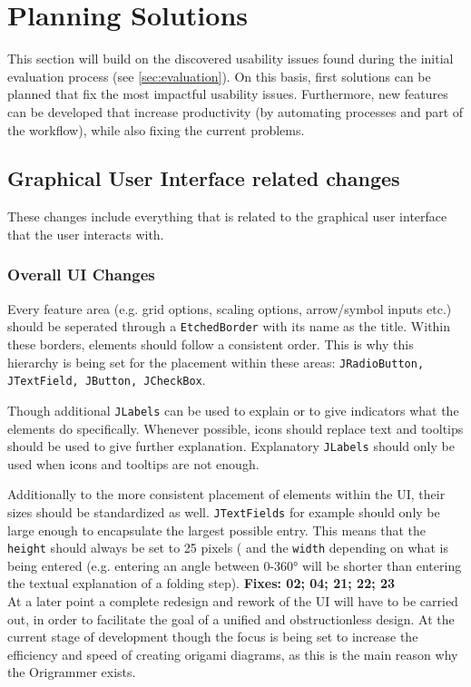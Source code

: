 
\section{Planning Solutions}
\label{sec:planningSolutions}

This section will build on the discovered usability issues found during the initial evaluation process (see \ref{sec:evaluation}). On this basis, first solutions can be planned that fix the most impactful usability issues. Furthermore, new features can be developed that increase productivity (by automating processes and part of the workflow), while also fixing the current problems.


\subsection{Graphical User Interface related changes}

These changes include everything that is related to the graphical user interface that the user interacts with.

\subsubsection{Overall UI Changes}
Every feature area (e.g. grid options, scaling options, arrow/symbol inputs etc.) should be seperated through a \texttt{EtchedBorder} with its name as the title. Within these borders, elements should follow a consistent order. This is why this hierarchy is being set for the placement within these areas: \texttt{JRadioButton, JTextField, JButton, JCheckBox}.

Though additional \texttt{JLabels} can be used to explain or to give indicators what the elements do specifically. Whenever possible, icons should replace text and tooltips should be used to give further explanation. Explanatory \texttt{JLabels} should only be used when icons and tooltips are not enough.

Additionally to the more consistent placement of elements within the UI, their sizes should be standardized as well. \texttt{JTextFields} for example should only be large enough to encapsulate the largest possible entry. This means that the \texttt{height} should always be set to 25 pixels ( and the \texttt{width} depending on what is being entered (e.g. entering an angle between 0-360° will be shorter than entering the textual explanation of a folding step).
\newline
\textbf{Fixes: 02; 04; 21; 22; 23}\\
\newline
At a later point a complete redesign and rework of the UI will have to be carried out, in order to facilitate the goal of a unified and obstructionless design. At the current stage of development though the focus is being set to increase the efficiency and speed of creating origami diagrams, as this is the main reason why the Origrammer exists.

